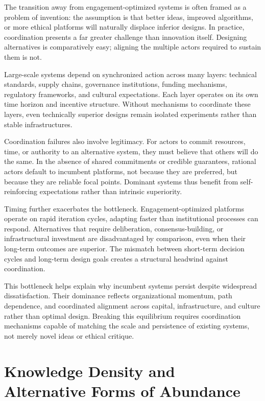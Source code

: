 \documentclass[12pt]{article}
\begin{document}
The transition away from engagement-optimized systems is often framed as a problem of invention: the assumption is that better ideas, improved algorithms, or more ethical platforms will naturally displace inferior designs. In practice, coordination presents a far greater challenge than innovation itself. Designing alternatives is comparatively easy; aligning the multiple actors required to sustain them is not.

Large-scale systems depend on synchronized action across many layers: technical standards, supply chains, governance institutions, funding mechanisms, regulatory frameworks, and cultural expectations. Each layer operates on its own time horizon and incentive structure. Without mechanisms to coordinate these layers, even technically superior designs remain isolated experiments rather than stable infrastructures.

Coordination failures also involve legitimacy. For actors to commit resources, time, or authority to an alternative system, they must believe that others will do the same. In the absence of shared commitments or credible guarantees, rational actors default to incumbent platforms, not because they are preferred, but because they are reliable focal points. Dominant systems thus benefit from self-reinforcing expectations rather than intrinsic superiority.

Timing further exacerbates the bottleneck. Engagement-optimized platforms operate on rapid iteration cycles, adapting faster than institutional processes can respond. Alternatives that require deliberation, consensus-building, or infrastructural investment are disadvantaged by comparison, even when their long-term outcomes are superior. The mismatch between short-term decision cycles and long-term design goals creates a structural headwind against coordination.

This bottleneck helps explain why incumbent systems persist despite widespread dissatisfaction. Their dominance reflects organizational momentum, path dependence, and coordinated alignment across capital, infrastructure, and culture rather than optimal design. Breaking this equilibrium requires coordination mechanisms capable of matching the scale and persistence of existing systems, not merely novel ideas or ethical critique.

\section{Knowledge Density and Alternative Forms of Abundance}
\end{document}
